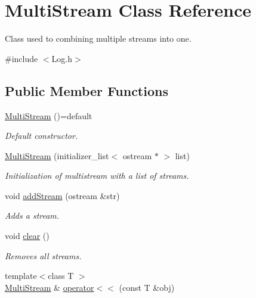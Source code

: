 \hypertarget{classMultiStream}{}\section{Multi\+Stream Class Reference}
\label{classMultiStream}


Class used to combining multiple streams into one.  




{\ttfamily \#include $<$Log.\+h$>$}

\subsection*{Public Member Functions}
\begin{DoxyCompactItemize}
\item 
\hyperlink{classMultiStream_ac428de0a7d172e4be3ab4d8fc8f05862}{Multi\+Stream} ()=default\hypertarget{classMultiStream_ac428de0a7d172e4be3ab4d8fc8f05862}{}\label{classMultiStream_ac428de0a7d172e4be3ab4d8fc8f05862}

\begin{DoxyCompactList}\small\item\em Default constructor. \end{DoxyCompactList}\item 
\hyperlink{classMultiStream_a012f0f1cdbfe8bd5c42748c808377485}{Multi\+Stream} (initializer\+\_\+list$<$ ostream $\ast$ $>$ list)
\begin{DoxyCompactList}\small\item\em Initialization of multistream with a list of streams. \end{DoxyCompactList}\item 
void \hyperlink{classMultiStream_aa0da819a03d7788c8151a364f2456f55}{add\+Stream} (ostream \&str)
\begin{DoxyCompactList}\small\item\em Adds a stream. \end{DoxyCompactList}\item 
void \hyperlink{classMultiStream_a360d75d172117c74c7e056581889a233}{clear} ()\hypertarget{classMultiStream_a360d75d172117c74c7e056581889a233}{}\label{classMultiStream_a360d75d172117c74c7e056581889a233}

\begin{DoxyCompactList}\small\item\em Removes all streams. \end{DoxyCompactList}\item 
{\footnotesize template$<$class T $>$ }\\\hyperlink{classMultiStream}{Multi\+Stream} \& \hyperlink{classMultiStream_a188e5ca0d44395b5585dc5a953c2f52b}{operator$<$$<$} (const T \&obj)\hypertarget{classMultiStream_a188e5ca0d44395b5585dc5a953c2f52b}{}\label{classMultiStream_a188e5ca0d44395b5585dc5a953c2f52b}


\end{DoxyCompactItemize}
